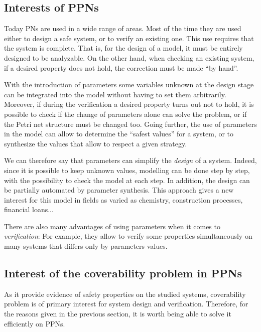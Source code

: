 \subsection{Interests of \acp{PPN}}


Today \acp{PN} are used in a wide range of areas. Most of the time they are used either to design a safe system, or to verify an existing one. This use requires that the system is complete. That is, for the design of a model, it must be entirely designed to be analyzable. On the other hand, when checking an existing system, if a desired property does not hold, the correction must be made ``by hand''.

With the introduction of parameters some variables unknown at the design stage can be integrated into the model without having to set them arbitrarily. Moreover, if during the verification a desired property turns out not to hold, it is possible to check if the change of parameters alone can solve the problem, or if the Petri net structure must be changed too. Going further, the use of parameters in the model can allow to determine the ``safest values'' for a system, or to synthesize the values that allow to respect a given strategy.

We can therefore say that parameters can simplify the \emph{design} of a system. Indeed, since it is possible to keep unknown values, modelling can be done step by step, with the possibility to check the model at each step.
In addition, the design can be partially automated by parameter synthesis.
This approach gives a new interest for this model in fields as varied as chemistry, construction processes, financial loans...

There are also many advantages of using parameters when it comes to \emph{verification}:
For example, they allow to verify some properties simultaneously on many systems that differs only by parameters values.

\subsection{Interest of the coverability problem in \acp{PPN}}


As it provide evidence of safety properties on the studied systems, coverability problem is of primary interest for system design and verification. Therefore, for the reasons given in the previous section, it is worth being able to solve it efficiently on \acp{PPN}.

